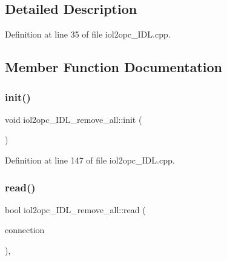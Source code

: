 \subsection{Detailed Description}


Definition at line 35 of file iol2opc\+\_\+\+I\+D\+L.\+cpp.



\subsection{Member Function Documentation}
\mbox{\label{classiol2opc__IDL__remove__all_a9390266caed32e6cefd21a040f260031}} 
\subsubsection{\texorpdfstring{init()}{init()}}
{\footnotesize\ttfamily void iol2opc\+\_\+\+I\+D\+L\+\_\+remove\+\_\+all\+::init (\begin{DoxyParamCaption}{ }\end{DoxyParamCaption})}



Definition at line 147 of file iol2opc\+\_\+\+I\+D\+L.\+cpp.

\mbox{\label{classiol2opc__IDL__remove__all_afd238b5574b40b09c022b6c706070646}} 
\subsubsection{\texorpdfstring{read()}{read()}}
{\footnotesize\ttfamily bool iol2opc\+\_\+\+I\+D\+L\+\_\+remove\+\_\+all\+::read (\begin{DoxyParamCaption}\item[{yarp\+::os\+::\+Connection\+Reader \&}]{connection }\end{DoxyParamCaption})\hspace{0.3cm}{\ttfamily [override]}, {\ttfamily [virtual]}}



